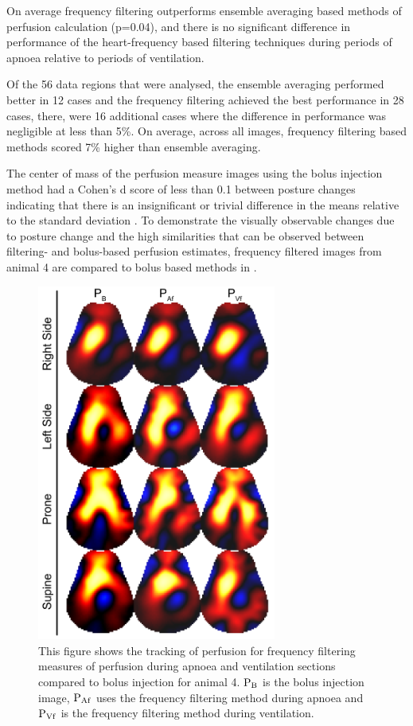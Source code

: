 On average frequency filtering outperforms ensemble averaging based methods
of perfusion calculation (p=0.04), and there is no significant difference in
performance of the heart-frequency based 
filtering techniques during periods of apnoea relative to periods of ventilation.

Of the 56 data regions that were analysed,
the ensemble averaging performed better in 12 cases and the frequency 
filtering achieved the best performance in 28 cases, there, were 16 additional cases 
where the difference in performance was negligible at less than 5\%. On 
average, across all images, frequency filtering based methods scored
7\% higher than ensemble averaging.

The center of mass of the perfusion 
measure images using the bolus injection method had a Cohen's d score of less than 0.1 
between posture changes
indicating that there is an insignificant or trivial difference in the means relative
to the standard deviation \parencite{Cohen1988}. 
To demonstrate the visually observable changes due to posture change and the 
high similarities that can be observed between filtering- and bolus-based 
perfusion estimates, frequency filtered images from 
animal 4 are compared to bolus based methods in .

\begin{figure}
\begin{flushright}
\includegraphics[width=0.7\textwidth]{chapter_2/imgs/fig-discussionSample.pdf}
\end{flushright}
\caption[Example perfusion images]{\label{fig:discussionSample}%
		This figure shows the tracking of perfusion for frequency filtering measures
		of perfusion during apnoea and ventilation sections compared to bolus injection
		for animal 4.
${\rm P_{B}}$ is the bolus injection image, 
${\rm P_{Af}}$ uses the frequency filtering method during apnoea and
${\rm P_{Vf}}$ is the frequency filtering method during ventilation.
}
\end{figure}

